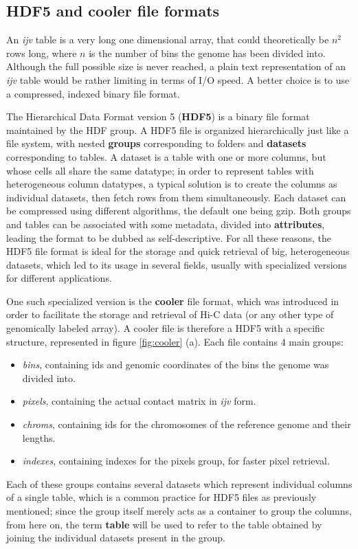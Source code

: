 \subsection{HDF5 and cooler file formats}
An \emph{ijv} table is a very long one dimensional array, that could theoretically be $n^2$ rows long, where $n$ is the number of bins the genome has been divided into. Although the full possible size is never reached, a plain text representation of an \emph{ijv} table would be rather limiting in terms of I/O speed. A better choice is to use a compressed, indexed binary file format. 

The Hierarchical Data Format version 5 (\textbf{HDF5}) is a binary file format maintained by the HDF group\cite{hdfgroup}. A HDF5 file is organized hierarchically just like a file system, with nested \textbf{groups} corresponding to folders and \textbf{datasets} corresponding to tables. A dataset is a table with one or more columns, but whose cells all share the same datatype; in order to represent tables with heterogeneous column datatypes, a typical solution is to create the columns as individual datasets, then fetch rows from them simultaneously. Each dataset can be compressed using different algorithms, the default one being gzip. Both groups and tables can be associated with some metadata, divided into \textbf{attributes}, leading the format to be dubbed as self-descriptive. For all these reasons, the HDF5 file format is ideal for the storage and quick retrieval of big, heterogeneous datasets, which led to its usage in several fields, usually with specialized versions for different applications.

One such specialized version is the \textbf{cooler} file format, which was introduced in order to facilitate the storage and retrieval of Hi-C data (or any other type of genomically labeled array)\cite{cooler2020}. A cooler file is therefore a HDF5 with a specific structure, represented in figure \ref{fig:cooler} (a). Each file contains 4 main groups:
\begin{itemize}\tightlist
  \item \emph{bins}, containing ids and genomic coordinates of the bins the genome was divided into.
  \item \emph{pixels}, containing the actual contact matrix in \emph{ijv} form.
  \item \emph{chroms}, containing ids for the chromosomes of the reference genome and their lengths.
  \item \emph{indexes}, containing indexes for the pixels group, for faster pixel retrieval.
\end{itemize}
Each of these groups contains several datasets which represent individual columns of a single table, which is a common practice for HDF5 files as previously mentioned; since the group itself merely acts as a container to group the columns, from here on, the term \textbf{table} will be used to refer to the table obtained by joining the individual datasets present in the group.

